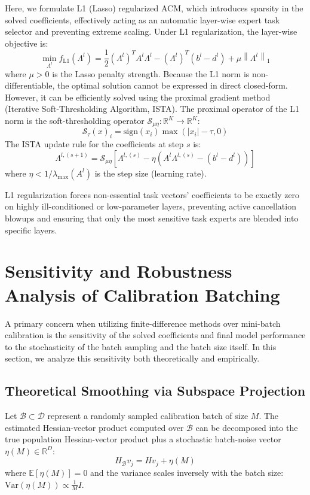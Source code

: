 Here, we formulate L1 (Lasso) regularized ACM, which introduces sparsity in the solved coefficients, effectively acting as an automatic layer-wise expert task selector and preventing extreme scaling. Under L1 regularization, the layer-wise objective is:
\begin{equation}
    \min_{\Lambda^l} f_{\text{L1}}(\Lambda^l) = \frac{1}{2} (\Lambda^l)^T A^l \Lambda^l - (\Lambda^l)^T (b^l - d^l) + \mu \left\| \Lambda^l \right\|_1
\end{equation}
where $\mu > 0$ is the Lasso penalty strength. Because the L1 norm is non-differentiable, the optimal solution cannot be expressed in direct closed-form. However, it can be efficiently solved using the proximal gradient method (Iterative Soft-Thresholding Algorithm, ISTA). The proximal operator of the L1 norm is the soft-thresholding operator $\mathcal{S}_{\mu \eta} : \mathbb{R}^K \to \mathbb{R}^K$:
\begin{equation}
    \mathcal{S}_{\tau}(x)_i = \text{sign}(x_i) \max\left( |x_i| - \tau, 0 \right)
\end{equation}
The ISTA update rule for the coefficients at step $s$ is:
\begin{equation}
    \Lambda^{l,(s+1)} = \mathcal{S}_{\mu \eta} \left[ \Lambda^{l,(s)} - \eta \left( A^l \Lambda^{l,(s)} - (b^l - d^l) \right) \right]
\end{equation}
where $\eta < 1 / \lambda_{\max}(A^l)$ is the step size (learning rate).

L1 regularization forces non-essential task vectors' coefficients to be exactly zero on highly ill-conditioned or low-parameter layers, preventing active cancellation blowups and ensuring that only the most sensitive task experts are blended into specific layers.

\section{Sensitivity and Robustness Analysis of Calibration Batching}
\label{app:sensitivity}

A primary concern when utilizing finite-difference methods over mini-batch calibration is the sensitivity of the solved coefficients and final model performance to the stochasticity of the batch sampling and the batch size itself. In this section, we analyze this sensitivity both theoretically and empirically.

\subsection{Theoretical Smoothing via Subspace Projection}
Let $\mathcal{B} \subset \mathcal{D}$ represent a randomly sampled calibration batch of size $M$. The estimated Hessian-vector product computed over $\mathcal{B}$ can be decomposed into the true population Hessian-vector product plus a stochastic batch-noise vector $\eta(M) \in \mathbb{R}^D$:
\begin{equation}
    H_{\mathcal{B}} v_j = H v_j + \eta(M)
\end{equation}
where $\mathbb{E}[\eta(M)] = 0$ and the variance scales inversely with the batch size: $\text{Var}(\eta(M)) \propto \frac{1}{M} I$. 

